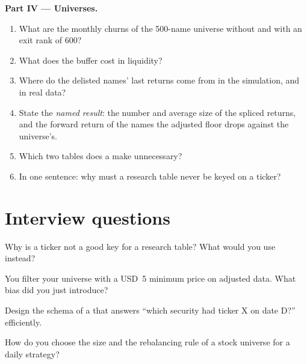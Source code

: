 \begin{problem}
\medskip\noindent\textbf{Part IV --- Universes.}
\begin{enumerate}[resume]
\item What are the monthly churns of the 500-name universe without and with an exit rank of 600?
\item What does the buffer cost in liquidity?
\item Where do the delisted names' last returns come from in the simulation, and in real data?
\item State the \emph{named result}: the number and average size of the spliced returns, and the forward return of the names the
adjusted floor drops against the universe's.
\item Which two tables does a  make unnecessary?
\item In one sentence: why must a research table never be keyed on a ticker?
\end{enumerate}
\end{problem}

\section{Interview questions}

\begin{interviewq}\label{iq:rs:universe-symbology-and-corporate-actions:1}
Why is a ticker not a good key for a research table? What would you use instead?
\end{interviewq}

\begin{interviewq}\label{iq:rs:universe-symbology-and-corporate-actions:2}
You filter your universe with a USD~5 minimum price on adjusted data. What bias did you just introduce?
\end{interviewq}

\begin{interviewq}\label{iq:rs:universe-symbology-and-corporate-actions:3}
Design the schema of a  that answers ``which security had ticker X on date D?'' efficiently.
\end{interviewq}

\begin{interviewq}\label{iq:rs:universe-symbology-and-corporate-actions:4}
How do you choose the size and the rebalancing rule of a stock universe for a daily strategy?
\end{interviewq}


